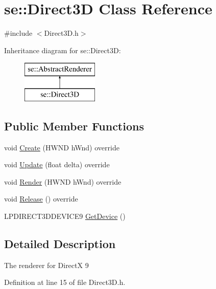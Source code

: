 \hypertarget{classse_1_1_direct3_d}{}\section{se\+:\+:Direct3D Class Reference}
\label{classse_1_1_direct3_d}


{\ttfamily \#include $<$Direct3\+D.\+h$>$}

Inheritance diagram for se\+:\+:Direct3D\+:\begin{figure}[H]
\begin{center}
\leavevmode
\includegraphics[height=2.000000cm]{classse_1_1_direct3_d}
\end{center}
\end{figure}
\subsection*{Public Member Functions}
\begin{DoxyCompactItemize}
\item 
void \mbox{\hyperlink{classse_1_1_direct3_d_a316456762829db0614077cccd655e654}{Create}} (H\+W\+ND h\+Wnd) override
\item 
void \mbox{\hyperlink{classse_1_1_direct3_d_a39934c194406f108a992d82a4d265381}{Update}} (float delta) override
\item 
void \mbox{\hyperlink{classse_1_1_direct3_d_a255a03bb492fb97f19e4c353f9ac35e6}{Render}} (H\+W\+ND h\+Wnd) override
\item 
void \mbox{\hyperlink{classse_1_1_direct3_d_ae2979f16a5c35773cf2c243d8e6f90e4}{Release}} () override
\item 
L\+P\+D\+I\+R\+E\+C\+T3\+D\+D\+E\+V\+I\+C\+E9 \mbox{\hyperlink{classse_1_1_direct3_d_a0735c84f0cdd65088702b03c4ed7c7b7}{Get\+Device}} ()
\end{DoxyCompactItemize}


\subsection{Detailed Description}
The renderer for DirectX 9 

Definition at line 15 of file Direct3\+D.\+h.



